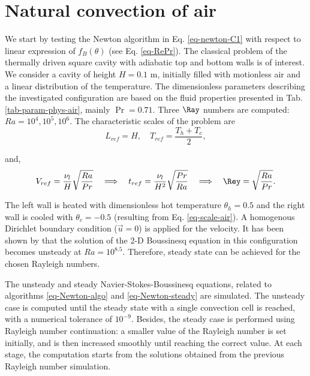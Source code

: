 \section{Natural convection of air}\label{sec: natconv-air-2D}
We start by testing the Newton algorithm in Eq. \ref{eq-newton-C1} with respect to linear expression of $f_B(\theta)$  (see Eq. \ref{eq-RePr}). %
The classical problem of the thermally driven square cavity with adiabatic top and bottom walls is of interest.
We consider a cavity of height $H = 0.1$ m, initially filled with motionless air and a linear distribution of the temperature. 
The dimensionless parameters describing the investigated configuration are based on the fluid properties presented in Tab. \ref{tab-param-phys-air}, mainly $\Pr = 0.71$.
Three $\Ray$ numbers are computed: $Ra = 10^4, 10^5, 10^6$. 
The characteristic scales of the problem are 
\begin{equation} \label{eq-scale-air}
	L_{ref} = H, \quad T_{ref} = \frac{T_h + T_c}{2},
\end{equation}

\noindent and,
\begin{equation} \label{eq-scaling-3}
   V_{ref} = \frac{\nu_l}{H} \sqrt{\frac{Ra}{Pr}} 
   \quad \Longrightarrow \quad t_{ref} = \frac{\nu_l}{H^2} \sqrt{\frac{Pr}{Ra}} 
   \quad \Longrightarrow \quad \Rey = \sqrt{\frac{Ra}{Pr}}.
\end{equation} 

\noindent The left wall is heated with dimensionless hot temperature $\theta_h = 0.5$ and the right wall is cooled with $\theta_c = -0.5$ (resulting from Eq. \ref{eq-scale-air}). 
A homogenous Dirichlet boundary condition ($\vec u = 0$) is applied for the velocity.
It has been shown by \cite{LeQuere91} that the solution of the 2-D Boussinesq equation in this configuration becomes unsteady at $Ra = 10^{8.5}$.
Therefore, steady state can be achieved for the chosen Rayleigh numbers.

The unsteady  and steady Navier-Stokes-Boussinesq equations, related to algorithms \ref{eq-Newton-algo} and \ref{eq-Newton-steady} are simulated.
The unsteady case is computed until the steady state with a single convection cell is reached, with a numerical tolerance of $10^{-9}$.
Besides, the steady case is performed using Rayleigh number continuation:
a smaller value of the Rayleigh number is set initially, and is then increased smoothly until reaching the correct value.
At each stage, the computation starts from the solutions obtained from the previous Rayleigh number simulation.

